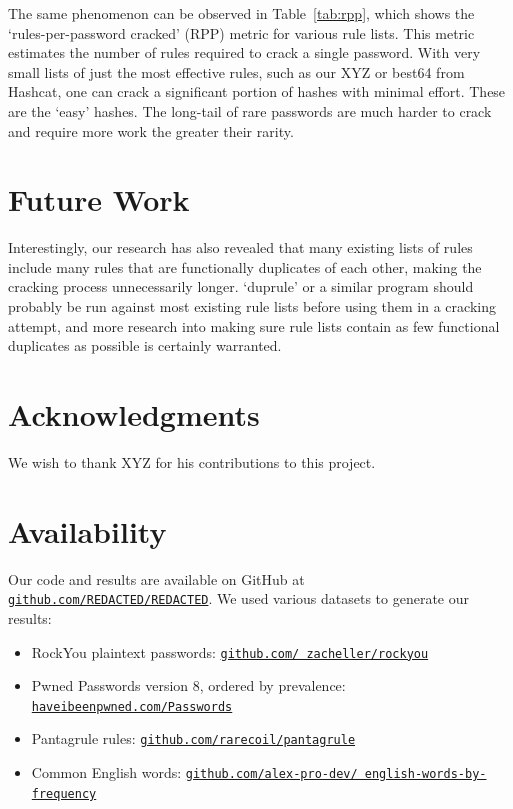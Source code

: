 \documentclass[letterpaper,twocolumn,10pt]{article}
\begin{document}
The same phenomenon can be observed in Table~\ref{tab:rpp}, which shows the
`rules-per-password cracked' (RPP) metric for various rule lists. This metric
estimates the number of rules required to crack a single password. With very
small lists of just the most effective rules, such as our XYZ or best64 from
Hashcat, one can crack a significant portion of hashes with minimal effort.
These are the `easy' hashes. The long-tail of rare passwords are much harder to
crack and require more work the greater their rarity.


\section{Future Work}
\label{sec:future-work}



Interestingly, our research has also revealed that many existing lists of rules
include many rules that are functionally duplicates of each other, making the
cracking process unnecessarily longer. `duprule' or a similar program should
probably be run against most existing rule lists before using them in a cracking
attempt, and more research into making sure rule lists contain as few functional
duplicates as possible is certainly warranted.

\section*{Acknowledgments}

We wish to thank XYZ for his contributions to this project.

\section*{Availability}

Our code and results are available on GitHub at
\texttt{\href{https://github.com/REDACTED/REDACTED}
{github.com/REDACTED/REDACTED}}. We used various datasets
to generate our results:

\begin{itemize}
\item RockYou plaintext passwords:
\texttt{\href{https://github.com/zacheller/rockyou}
{github.com/ zacheller/rockyou}}
\item Pwned Passwords version 8, ordered by prevalence:
\texttt{\href{https://haveibeenpwned.com/Passwords}
{haveibeenpwned.com/Passwords}}
\item Pantagrule rules:
\texttt{\href{https://github.com/rarecoil/pantagrule}
{github.com/rarecoil/pantagrule}}
\item Common English words:
\texttt{\href{https://github.com/alex-pro-dev/english-words-by-frequency}
{github.com/alex-pro-dev/ english-words-by-frequency}}
\end{itemize}
\end{document}
